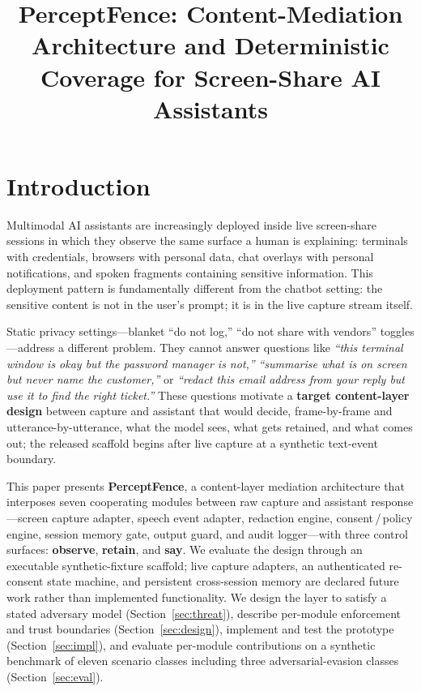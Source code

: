 \documentclass[pdflatex,sn-mathphys-num]{sn-jnl}
\title[PerceptFence Content-Mediation Coverage]{%
  PerceptFence: Content-Mediation Architecture and Deterministic Coverage for
  Screen-Share AI Assistants}
\author[1]{\sur{Anonymous Author(s)}}
\affil[1]{\orgname{Affiliation withheld for double-anonymous review}}
\newif\ifblind
\begin{document}
\ifblind\doublespacing\linenumbers\fi

\maketitle

\section{Introduction}\label{sec:intro}

Multimodal AI assistants are increasingly deployed inside live screen-share
sessions in which they observe the same surface a human is explaining:
terminals with credentials, browsers with personal data, chat overlays with
personal notifications, and spoken fragments containing sensitive information.
This deployment pattern is fundamentally different from the chatbot setting:
the sensitive content is not in the user's prompt; it is in the live capture
stream itself.

Static privacy settings---blanket ``do not log,'' ``do not share with
vendors'' toggles---address a different problem.
They cannot answer questions like \textit{``this terminal window is okay but
the password manager is not,''} \textit{``summarise what is on screen but
never name the customer,''} or \textit{``redact this email address from your
reply but use it to find the right ticket.''}
These questions motivate a \textbf{target content-layer design} between capture
and assistant that would decide, frame-by-frame and utterance-by-utterance, what
the model sees, what gets retained, and what comes out; the released scaffold
begins after live capture at a synthetic text-event boundary.

This paper presents \textbf{PerceptFence}, a content-layer mediation
architecture that interposes seven cooperating modules between raw capture and
assistant response---screen capture adapter, speech event adapter, redaction
engine, consent\,/\,policy engine, session memory gate, output guard, and
audit logger---with three control surfaces: \textbf{observe}, \textbf{retain},
and \textbf{say}. We evaluate the design through an executable
synthetic-fixture scaffold; live capture adapters, an authenticated re-consent
state machine, and persistent cross-session memory are declared future work
rather than implemented functionality.
We design the layer to satisfy a stated adversary model
(Section~\ref{sec:threat}), describe per-module enforcement and trust
boundaries (Section~\ref{sec:design}), implement and test the prototype
(Section~\ref{sec:impl}), and evaluate per-module contributions on a synthetic
benchmark of eleven scenario classes including three adversarial-evasion
classes (Section~\ref{sec:eval}).
\end{document}
